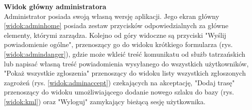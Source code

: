 \noindent
\textbf{Widok główny administratora}\\
\indent Administrator posiada swoją własną wersję aplikacji. Jego ekran główny \ref{widok:adminhome} posiada zestaw przycisków odpowiedzialnych za główne elementy, którymi zarządza. Kolejno od góry widoczne są przyciski "Wyślij powiadomienie ogólne", przenoszący go do widoku krótkiego formularza (rys. \ref{widok:admindanger}), gdzie może wkleić treść komunikatu od służb tatrzańskich lub napisać własną treść powiadomienia wysyłanego do wszystkich użytkowników, "Pokaż wszystkie zgłoszenia" przenoszący do widoku listy wszystkich zgłoszonych zagrożeń (rys. \ref{widok:adminaccept}) czekających na akceptację, "Dodaj trasę" przenoszący do widoku umożliwiającego dodanie nowego szlaku do bazy (rys. \ref{widok:kml}) oraz "Wyloguj" zamykający bieżącą sesję użytkownika.
\begin{figure}[H]
    \centering

\end{figure}
